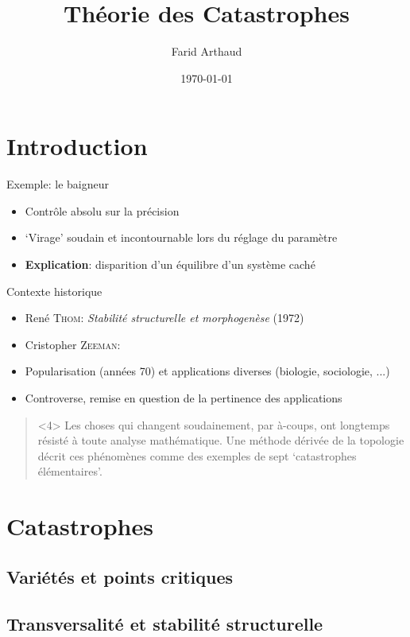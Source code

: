 \documentclass{beamer}
\author{Farid Arthaud}
\title{Théorie des Catastrophes}
\date{\today}
\begin{document}
\frame{\titlepage}

\frame{\tableofcontents}

\section*{Introduction}
\begin{frame}{Exemple: le baigneur}
    \begin{itemize}
        \item Contrôle absolu sur la précision
        \item `Virage' soudain et incontournable lors du réglage du paramètre
        \pause
        \item \textbf{Explication}: disparition d'un équilibre d'un système caché
    \end{itemize}
\end{frame}
\begin{frame}{Contexte historique}
    \begin{itemize}[<+->]
        \item René \textsc{Thom}: \textit{Stabilité structurelle et morphogenèse} (1972)
        \item Cristopher \textsc{Zeeman}:
        \item Popularisation (années 70) et applications diverses (biologie, sociologie, ...)
        \item Controverse, remise en question de la pertinence des applications
    \end{itemize}
    \begin{quote}<4>
        Les choses qui changent soudainement, par à-coups, ont longtemps résisté à toute analyse mathématique.
        Une méthode dérivée de la topologie décrit ces phénomènes comme des exemples de sept `catastrophes élémentaires'.
    \end{quote}
\end{frame}

\section{Catastrophes}
\subsection{Variétés et points critiques}
\subsection{Transversalité et stabilité structurelle}
\end{document}
